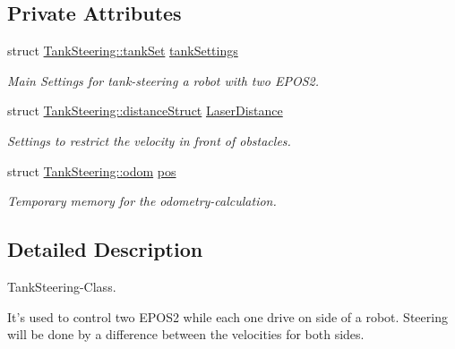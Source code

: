 \subsection*{Private Attributes}
\begin{DoxyCompactItemize}
\item 
\hypertarget{classTankSteering_a6973af1afc00c9b11f32ecc7ad7e8a14}{struct \hyperlink{structTankSteering_1_1tankSet}{Tank\-Steering\-::tank\-Set} \hyperlink{classTankSteering_a6973af1afc00c9b11f32ecc7ad7e8a14}{tank\-Settings}}\label{classTankSteering_a6973af1afc00c9b11f32ecc7ad7e8a14}

\begin{DoxyCompactList}\small\item\em Main Settings for tank-\/steering a robot with two E\-P\-O\-S2. \end{DoxyCompactList}\item 
\hypertarget{classTankSteering_a63ff23d449dca437f90e16f3a3684c20}{struct \hyperlink{structTankSteering_1_1distanceStruct}{Tank\-Steering\-::distance\-Struct} \hyperlink{classTankSteering_a63ff23d449dca437f90e16f3a3684c20}{Laser\-Distance}}\label{classTankSteering_a63ff23d449dca437f90e16f3a3684c20}

\begin{DoxyCompactList}\small\item\em Settings to restrict the velocity in front of obstacles. \end{DoxyCompactList}\item 
\hypertarget{classTankSteering_ae08d9f507d6de01a86f59aa135283abc}{struct \hyperlink{structTankSteering_1_1odom}{Tank\-Steering\-::odom} \hyperlink{classTankSteering_ae08d9f507d6de01a86f59aa135283abc}{pos}}\label{classTankSteering_ae08d9f507d6de01a86f59aa135283abc}

\begin{DoxyCompactList}\small\item\em Temporary memory for the odometry-\/calculation. \end{DoxyCompactList}\end{DoxyCompactItemize}


\subsection{Detailed Description}
Tank\-Steering-\/\-Class. 

It's used to control two E\-P\-O\-S2 while each one drive on side of a robot. Steering will be done by a difference between the velocities for both sides. 

